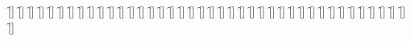 \begin{questions}
\begin{multicols}{2}
        \question \f[]
        \question \f[]
        \question \f[]
        \question \f[]
        \question \f[]
        \question \f[]
        \question \f[]
        \question \f[]
        \question \f[]
        \question \f[]
        \question \f[]
        \question \f[]
        \question \f[]
        \question \f[]
        \question \f[]
        \question \f[]
        \question \f[]
        \question \f[]
        \question \f[]
        \question \f[]
        \question \f[]
        \question \f[]
        \question \f[]
        \question \f[]
        \question \f[]
        \question \f[]
        \question \f[]
        \question \f[]
        \question \f[]
        \question \f[]
        \question \f[]
        \question \f[]
        \question \f[]
        \question \f[]
        \question \f[]
        \question \f[]
        \question \f[]
        \question \f[]
        \question \f[]
        \question \f[]
        \question \f[]
    \end{multicols}
\end{questions}
